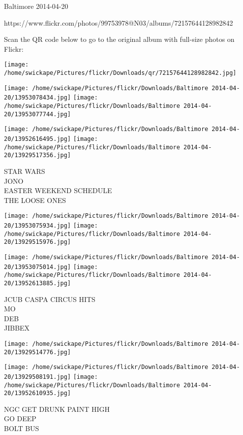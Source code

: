 \documentclass[10pt,letterpaper]{article}
\begin{document}
Baltimore 2014-04-20

https://www.flickr.com/photos/99753978@N03/albums/72157644128982842

Scan the QR code below to go to the original album with full-size photos on Flickr:

\texttt{[image: /home/swickape/Pictures/flickr/Downloads/qr/72157644128982842.jpg]}
\pagebreak

\texttt{[image: /home/swickape/Pictures/flickr/Downloads/Baltimore 2014-04-20/13953078434.jpg]}
\texttt{[image: /home/swickape/Pictures/flickr/Downloads/Baltimore 2014-04-20/13953077744.jpg]}

\texttt{[image: /home/swickape/Pictures/flickr/Downloads/Baltimore 2014-04-20/13952616495.jpg]}
\texttt{[image: /home/swickape/Pictures/flickr/Downloads/Baltimore 2014-04-20/13929517356.jpg]}

STAR WARS\\
JONO\\
EASTER WEEKEND SCHEDULE\\
THE LOOSE ONES\\
\pagebreak

\texttt{[image: /home/swickape/Pictures/flickr/Downloads/Baltimore 2014-04-20/13953075934.jpg]}
\texttt{[image: /home/swickape/Pictures/flickr/Downloads/Baltimore 2014-04-20/13929515976.jpg]}

\texttt{[image: /home/swickape/Pictures/flickr/Downloads/Baltimore 2014-04-20/13953075014.jpg]}
\texttt{[image: /home/swickape/Pictures/flickr/Downloads/Baltimore 2014-04-20/13952613885.jpg]}

JCUB CASPA CIRCUS HITS\\
MO\\
DEB\\
JIBBEX\\
\pagebreak

\texttt{[image: /home/swickape/Pictures/flickr/Downloads/Baltimore 2014-04-20/13929514776.jpg]}

\vspace{0.25in}
\texttt{[image: /home/swickape/Pictures/flickr/Downloads/Baltimore 2014-04-20/13929508191.jpg]}
\texttt{[image: /home/swickape/Pictures/flickr/Downloads/Baltimore 2014-04-20/13952610935.jpg]}

NGC GET DRUNK PAINT HIGH\\
GO DEEP\\
BOLT BUS\\
\pagebreak
\end{document}
